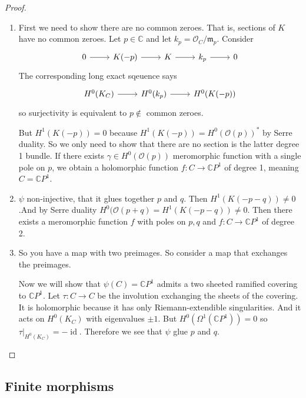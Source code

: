 \begin{proof}\leavevmode
	\begin{enumerate}[label=\textbf{Step \arabic*}]
		\item First we need to show there are no common zeroes. That is, sections of $K$ have no common zeroes. Let $ p \in\mathbb{C}$ and let $k_p=\mathcal{O}_C/\mathfrak{m}_p$. Consider 
			\[\begin{tikzcd}
			0\arrow[r]&K(-p)\arrow[r]&K\arrow[r]&k_{p}\arrow[r]&0
		\end{tikzcd}\]
The corresponding long exact sqeuence says
\[\begin{tikzcd}
	H^{0}(K_C)\arrow[r]&H^{0}(k_p)\arrow[r]&H^{0}(K(-p))
\end{tikzcd}\]
so surjectivity is equivalent to $p  \not \in $ common zeroes.

But $H^{1}(K(-p))=0$ because $H^{1}(K(-p))=H^{0}(\mathcal{O}(p))^*$ by Serre duality. So we only need to show that there are no section is the latter degree 1 bundle. If there exists $\gamma \in H^{0}(\mathcal{O}(p))$ meromorphic function with a single pole on $p$,  we obtain a holomorphic function $f:C\longrightarrow \mathbb{C}P^{1}$ of degree 1, meaning $C=\mathbb{C}P^{1}$.

\item $\psi$ non-injective, that it glues together $p$ and $q$. Then $H^{1}(K(-p-q))\neq 0$.And by Serre duality $H^{0}(\mathcal{O}(p+q)=H^{1}(K(-p-q))\neq 0$. Then there exists a meromorphic function $f$ with poles on $p,q$ and  $f:C\longrightarrow \mathbb{C}P^{1}$ of degree 2.

\item So you have a map with two preimages. So consider a map that exchanges the preimages.

		Now we will show that $\psi(C)=\mathbb{C}P^{1}$ admits a two sheeted ramified covering to $\mathbb{C}P^{1}$. Let $\tau:C\longrightarrow C$ be the involution exchanging the sheets of the covering. It is holomorphic because it has only Riemann-extendible singularities. And it acts on $H^{0}(K_C)$ with eigenvalues $\pm 1$. But $H^{0}(\Omega^{1}(\mathbb{C}P^{1}) )=0$ so $\tau|_{H^{0}(K_C)}=-\operatorname{id}$. Therefore we see that $\psi$ glue $p$ and  $q$.
	\end{enumerate}
\end{proof}

\subsection{Finite morphisms}

